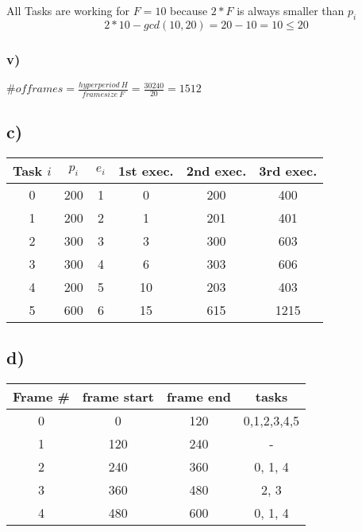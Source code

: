 \documentclass[10pt,a4paper]{article}
\begin{document}
All Tasks are working for $F=10$ because $2*F$ is always smaller than $p_i$
\begin{equation}
2 * 10 - gcd(10, 20) = 20 - 10 = 10 \leq 20
\end{equation}


\subsubsection*{v)}
$\# of frames = \frac{hyperperiod ~H}{framesize ~F} = \frac{30240}{20} = 1512$ 

\subsection*{c)}

\begin{tabular}{| c | c | c || c | c | c |}
  \hline
  Task $i$ & $p_i$ & $e_i$ & 1st exec. & 2nd exec. & 3rd exec. \\
  \hline
  0 & 200 & 1 & 0 & 200 & 400 \\
  \hline
  1 & 200 & 2 & 1 & 201 & 401 \\
  \hline
  2 & 300 & 3 & 3 & 300 & 603 \\
  \hline
  3 & 300 & 4 & 6 & 303 & 606 \\
  \hline
  4 & 200 & 5 & 10 & 203 & 403 \\
  \hline
  5 & 600 & 6 & 15 & 615 & 1215 \\
  \hline
\end{tabular}

\subsection*{d)}
\begin{tabular}{| c | c | c | c |}
\hline
Frame \# & frame start & frame end & tasks \\
\hline
0 & 0 & 120 & 0,1,2,3,4,5 \\
\hline
1 & 120 & 240 & - \\
\hline
2 & 240 & 360 & 0, 1, 4 \\
\hline
3 & 360 & 480 & 2, 3 \\
\hline
4 & 480 & 600 & 0, 1, 4 \\
\hline
\end{tabular}
\end{document}
